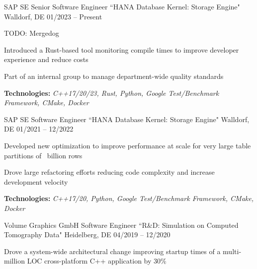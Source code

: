 \begin{cventries}
  \cventry
    {SAP SE}
    {Senior Software Engineer ``HANA Database Kernel: Storage Engine"}
    {Walldorf, DE}
    {01/2023 -- Present}
    {
      \begin{cvitems}
        \item {TODO: Mergedog}
        \item {Introduced a Rust-based tool monitoring compile times to improve developer experience and reduce costs}
        \item {Part of an internal group to manage department-wide quality standards}
        \item {\textbf{Technologies:} \textit{C++17/20/23, Rust, Python, Google Test/Benchmark Framework, CMake, Docker}}
      \end{cvitems}
    }
  \cventry
    {SAP SE}
    {Software Engineer ``HANA Database Kernel: Storage Engine"}
    {Walldorf, DE}
    {01/2021 -- 12/2022}
    {
      \begin{cvitems}
        \item {Developed new optimization to improve performance at scale for very large table partitions of \ billion rows}
        \item {Drove large refactoring efforts reducing code complexity and increase development velocity}
        \item {\textbf{Technologies:} \textit{C++17/20, Python, Google Test/Benchmark Framework, CMake, Docker}}
      \end{cvitems}
    }
  \cventry
    {Volume Graphics GmbH}
    {Software Engineer ``R\&D: Simulation on Computed Tomography Data"}
    {Heidelberg, DE}
    {04/2019 -- 12/2020}
    {
      \begin{cvitems}
        \item {Drove a system-wide architectural change improving startup times of a multi-million LOC cross-platform C++ application by 30\%}

\end{cvitems}}
\end{cventries}
